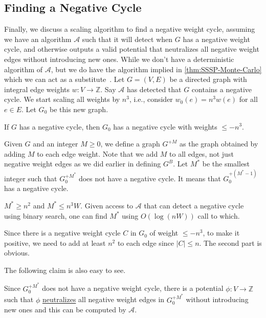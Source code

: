 \subsection{Finding a Negative Cycle}
Finally, we discuss a scaling algorithm to find a negative weight cycle, assuming we have an algorithm \(\mathcal{A} \) such that it will detect when \(G\) has a negative weight cycle, and otherwise outputs a valid potential that neutralizes all negative weight edges without introducing new ones. While we don't have a deterministic algorithm of \(\mathcal{A} \), but we do have the algorithm implied in \autoref{thm:SSSP-Monte-Carlo} which we can act as a substitute~\cite{bernstein2022negative,bringmann2023negative}. Let \(G = (V, E)\) be a directed graph with integral edge weights \(w \colon V \to \mathbb{Z} \). Say \(\mathcal{A} \) has detected that \(G\) contains a negative cycle. We start scaling all weights by \(n^3\), i.e., consider \(w_0(e) = n^3 w(e)\) for all \(e \in E\). Let \(G_0\) be this new graph.

\begin{note}
	If \(G\) has a negative cycle, then \(G_0\) has a negative cycle with weights \(\leq -n^3\).
\end{note}

Given \(G\) and an integer \(M \geq 0\), we define a graph \(G^{+M}\) as the graph obtained by adding \(M\) to each edge weight. Note that we add \(M\) to all edges, not just negative weight edges as we did earlier in defining \(G^B\). Let \(M^{\ast} \) be the smallest integer such that \(G_0^{+M^{\ast} }\) does not have a negative cycle. It means that \(G_0^{+(M^{\ast} -1)}\) has a negative cycle.

\begin{claim}
	\(M^{\ast} \geq n^2\) and \(M^{\ast} \leq n^3 W\). Given access to \(\mathcal{A} \) that can detect a negative cycle using binary search, one can find \(M^{\ast} \) using \(O(\log (nW))\) call to which.
\end{claim}
\begin{explanation}
	Since there is a negative weight cycle \(C\) in \(G_0\) of weight \(\leq -n^3\), to make it positive, we need to add at least \(n^2\) to each edge since \(\lvert C \rvert \leq n\). The second part is obvious.
\end{explanation}

The following claim is also easy to see.

\begin{claim}
	Since \(G_0^{+M^{\ast} }\) does not have a negative weight cycle, there is a potential \(\phi \colon V \to \mathbb{Z} \) such that \(\phi \) \hyperref[def:neutralize]{neutralizes} all negative weight edges in \(G_0^{+M^{\ast} }\) without introducing new ones and this can be computed by \(\mathcal{A} \).
\end{claim}


